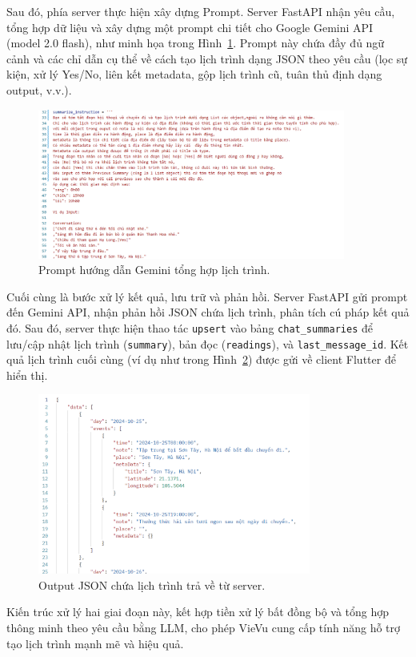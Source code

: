 Sau đó, phía server thực hiện xây dựng Prompt. Server FastAPI nhận yêu cầu, tổng hợp dữ liệu và xây dựng một prompt chi tiết cho Google Gemini API (model 2.0 flash), như minh họa trong Hình~\ref{fig:prompt}. Prompt này chứa đầy đủ ngữ cảnh và các chỉ dẫn cụ thể về cách tạo lịch trình dạng JSON theo yêu cầu (lọc sự kiện, xử lý Yes/No, liên kết metadata, gộp lịch trình cũ, tuân thủ định dạng output, v.v.). %
    \begin{figure}[H]
        \centering
        \includegraphics[width=0.9\textwidth]{figures/c4/prompt2.png}
        \caption{Prompt hướng dẫn Gemini tổng hợp lịch trình.}
        \label{fig:prompt}
    \end{figure}

Cuối cùng là bước xử lý kết quả, lưu trữ và phản hồi. Server FastAPI gửi prompt đến Gemini API, nhận phản hồi JSON chứa lịch trình, phân tích cú pháp kết quả đó. Sau đó, server thực hiện thao tác \texttt{upsert} vào bảng \texttt{chat\_summaries} để lưu/cập nhật lịch trình (\texttt{summary}), bản đọc (\texttt{readings}), và \texttt{last\_message\_id}. Kết quả lịch trình cuối cùng (ví dụ như trong Hình~\ref{fig:output}) được gửi về client Flutter để hiển thị.
    \begin{figure}[H]
        \centering
        \includegraphics[width=0.8\textwidth]{figures/c4/output.png}
        \caption{Output JSON chứa lịch trình trả về từ server.}
        \label{fig:output}
    \end{figure}

Kiến trúc xử lý hai giai đoạn này, kết hợp tiền xử lý bất đồng bộ và tổng hợp thông minh theo yêu cầu bằng LLM, cho phép VieVu cung cấp tính năng hỗ trợ tạo lịch trình mạnh mẽ và hiệu quả.

